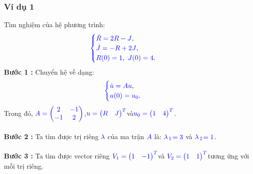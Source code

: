 \documentclass[a4paper]{article}
\begin{document}
\subsubsection{Ví dụ 1}
Tìm nghiệm của hệ phương trình:
\begin{align}
	    \textcolor{blue}{
	    \begin{cases}
            \dot R = 2R - J \textcolor{black}{,}\\
            \dot J = -R + 2J \textcolor{black}{,}\\
            R(0) = 1\textcolor{black}{,} \enskip J(0) = 4 \textcolor{black}{.}
        \end{cases}
        }
        \notag
	\end{align}
{\bfseries Bước 1 :} Chuyển hệ về dạng:
\begin{align}
	    \textcolor{blue}{
	    \begin{cases}
            \dot u = Au \textcolor{black}{,}\\
            u(0) = u\sb{0}\textcolor{black}{.}
        \end{cases}
        }
       \notag
	\end{align}
Trong đó,  $\textcolor{blue}{A = \begin{pmatrix} 2 & -1\\ -1 & 2 \end{pmatrix}}$,\enskip $\textcolor{blue}{u = \begin{pmatrix} R & J \end{pmatrix}\sp{T}}$\enskip và\enskip $\textcolor{blue}{u\sb{0} = \begin{pmatrix} 1 & 4 \end{pmatrix}\sp{T}}$.\\\\
{\bfseries Bước 2 :} Ta tìm được trị riêng $\textcolor{blue}{\lambda}$ của ma trận $\textcolor{blue}{A}$ là: $\textcolor{blue}{\lambda}$$\textcolor{blue}{\sb{1}}$$\textcolor{blue}{=3}$ và $\textcolor{blue}{\lambda}$$\textcolor{blue}{\sb{2}}$$\textcolor{blue}{=1}$.\\\\
{\bfseries Bước 3 :} Ta tìm được vector riêng \enskip $\textcolor{blue}{V\sb{1} = \begin{pmatrix} 1 & -1 \end{pmatrix}\sp{T}}$\enskip và \enskip $\textcolor{blue}{V\sb{2} = \begin{pmatrix} 1 & 1 \end{pmatrix}\sp{T}}$\enskip tương ứng với mỗi trị riêng.\\\\
\end{document}
